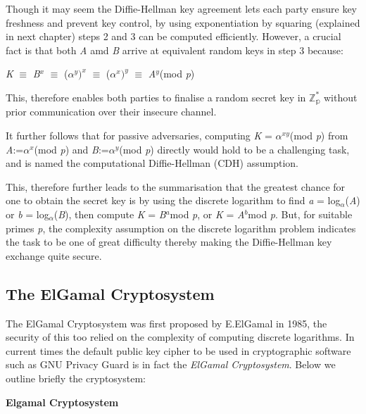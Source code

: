 \documentclass[iwp,first]{luthesis}
\begin{document}
Though it may seem the Diffie-Hellman key agreement lets each party ensure key freshness and prevent key control, by using exponentiation by squaring (explained in next chapter) steps 2 and 3 can be computed efficiently.  However, a crucial fact is that both \textit{A} amd \textit{B}  arrive at equivalent random keys in step 3 because:

\begin{center} 
\textit{K} $\equiv$ \textit{B$^x$} $\equiv$ ($\alpha^y)^x$ $\equiv$ ($\alpha^x)^y$ $\equiv$ \textit{A$^y$}(mod \textit{p})
\end{center} 

This, therefore enables both parties to finalise a random secret key in $\mathbb{Z^{*}_p}$ without prior communication over their insecure channel. 

It further follows that for passive adversaries, computing \textit{K} = \textit{$\alpha^{xy}$}(mod \textit{p}) from \textit{A}:=\textit{$\alpha^x$}(mod \textit{p}) and \textit{B}:=$\alpha^y$(mod \textit{p}) directly would hold to be a challenging task, and is named the computational Diffie-Hellman (CDH) assumption.

This, therefore further leads to the summarisation that the greatest chance for one to obtain the secret key is by using the discrete logarithm to find \textit{a} = log$_\alpha$(\textit{A}) or \textit{b} = log$_\alpha$(\textit{B}), then compute \textit{K} = \textit{B$^a$}mod \textit{p}, or \textit{K} = \textit{A$^b$}mod \textit{p}. But, for suitable primes \textit{p}, the complexity assumption on the discrete logarithm problem indicates the task to be one of great difficulty thereby making the Diffie-Hellman key exchange quite secure.

\subsection{The ElGamal Cryptosystem}

The ElGamal Cryptosystem was first proposed by E.ElGamal in 1985, the security of this too relied on the complexity of computing discrete logarithms. In current times the default public key cipher to be used in cryptographic software such as GNU Privacy Guard is in fact the \textit{ElGamal Cryptosystem}. Below we outline briefly the cryptosystem:

\newpage
\textbf{Elgamal Cryptosystem}
\end{document}
